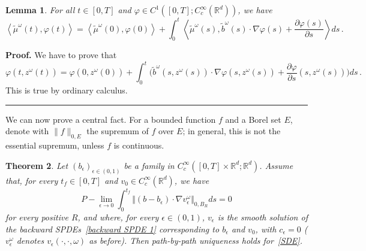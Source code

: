 \documentclass[a4paper,10pt]{article}
\newtheorem{theorem}{Theorem}
\newtheorem{lemma}[theorem]{Lemma}
\newenvironment{proof}[1][Proof]{\noindent\textbf{#1.} }{\ \rule{0.5em}{0.5em}}
\begin{document}
\begin{lemma}
\label{lemma_equation_mu_tilde}
For all $t\in [0,T]$ and $\varphi\in C^{1}([0,T];C_{c}^{\infty}(\mathbb{R}^{d}))$, we have
\[
\left\langle \widetilde{\mu}^\omega(t)  ,\varphi(
t)  \right\rangle =\left\langle \widetilde{\mu}^\omega(
0)  ,\varphi(  0)  \right\rangle +\int_{0}^{t}\left\langle
\widetilde{\mu}^\omega(s)  ,\widetilde{b}^\omega(
s)  \cdot\nabla\varphi(s)  +\frac{\partial\varphi(
s)  }{\partial s}\right\rangle ds \,.
\]
\end{lemma}

\begin{proof}
We have to prove that
\[
\varphi(t,z^\omega(t))  =\varphi(0,z^\omega(0))  +\int_{0}^{t} \big( \widetilde{b}
^\omega(s,z^\omega(s))  \cdot\nabla
\varphi(s,z^\omega(s))  +\frac{\partial\varphi
}{\partial s}(s,z^\omega(s) )  \big)  ds \,.
\]
This is true by ordinary calculus.
\end{proof}

We can now prove a central fact. For a bounded function $f$ and a Borel set $E$, denote with $\|f\|_{0,E}$ the supremum of $f$ over $E$; in general, this is not the essential supremum, unless $f$ is continuous.

\begin{theorem}
\label{Theo sufficient for sDE}
Let $(b_{\epsilon})_{\epsilon\in (0,1)}$ be a family in $C_{c}^{\infty}([0,T]  \times\mathbb{R}^{d};\mathbb{R}^{d})$. Assume that, for
every $t_{f}\in [0,T]  $ and $v_{0}\in C_{c}^{\infty} 
(\mathbb{R}^{d})$, we have 
\begin{equation}
P-\lim_{\epsilon\rightarrow0}\int_{0}^{t_{f}} \Vert (  b-b_{\epsilon}) \cdot\nabla v_{\epsilon}^\omega \Vert
_{0,B_R}ds=0 \label{main condition for sDE} 
\end{equation}
for every positive $R$, and where, for every $\epsilon\in(0,1)$, $v_{\epsilon}$ is the
smooth solution of the backward SPDEs~\eqref{backward SPDE 1} corresponding to
$b_{\epsilon}$ and $v_{0}$, with $c_{\epsilon}=0$ ($v_\epsilon^\omega$ denotes $v_\epsilon(\cdot,\cdot,\omega)$ as before). Then path-by-path
uniqueness holds for~\eqref{SDE}.
\end{theorem}
\end{document}
